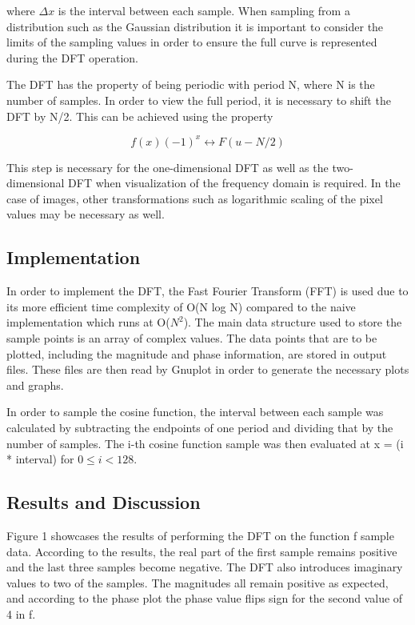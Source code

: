 \documentclass[headings=optiontoheadandtoc,listof=totoc,parskip=full]{scrartcl}
\begin{document}
where \(\Delta x\) is the interval between each sample. When sampling from a distribution such as the Gaussian distribution it is important to consider the limits of the sampling values in order to ensure the full curve is represented during the DFT operation.

The DFT has the property of being periodic with period N, where N is the number of samples. In order to view the full period, it is necessary to shift the DFT by N/2. This can be achieved using the property 

        \[
        	f(x)(-1)^x \leftrightarrow F(u-N/2)
        \]

This step is necessary for the one-dimensional DFT as well as the two-dimensional DFT when visualization of the frequency domain is required. In the case of images, other transformations such as logarithmic scaling of the pixel values may be necessary as well.

\subsection{Implementation}

In order to implement the DFT, the Fast Fourier Transform (FFT) is used due to its more efficient time complexity of O(N log N) compared to the naive implementation which runs at O(\(N^2\)). The main data structure used to store the sample points is an array of complex values. The data points that are to be plotted, including the magnitude and phase information, are stored in output files. These files are then read by Gnuplot in order to generate the necessary plots and graphs.

In order to sample the cosine function, the interval between each sample was calculated by subtracting the endpoints of one period and dividing that by the number of samples. The i-th cosine function sample was then evaluated at x = (i * interval) for $0 \leq i < 128$.

\subsection{Results and Discussion}

Figure 1 showcases the results of performing the DFT on the function f sample data. According to the results, the real part of the first sample remains positive and the last three samples become negative. The DFT also introduces imaginary values to two of the samples. The magnitudes all remain positive as expected, and according to the phase plot the phase value flips sign for the second value of 4 in f.
\end{document}

